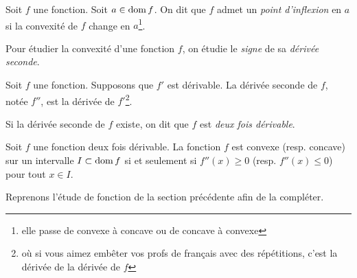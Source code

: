 \documentclass[main.tex]{subfiles}
\begin{document}
\begin{definition}
    
    Soit $f$ une fonction.
    Soit $a \in \operatorname{dom} f$.
    On dit que $f$ admet un \emph{point d'inflexion} en $a$ si la convexité de $f$ change en $a$\footnote{elle passe de convexe à concave ou de concave à convexe}.
\end{definition}

Pour étudier la convexité d'une fonction $f$, on étudie le \emph{signe} de sa \emph{dérivée seconde}.

\begin{definition}
    
    Soit $f$ une fonction.
    Supposons que $f'$ est dérivable.
    La dérivée seconde de $f$, notée $f''$, est la dérivée de $f'$\footnote{où si vous aimez embêter vos profs de français avec des répétitions, c'est la dérivée de la dérivée de $f$}.
\end{definition}

Si la dérivée seconde de $f$ existe, on dit que $f$ est \emph{deux fois dérivable}.

\begin{proposition}
    
    Soit $f$ une fonction deux fois dérivable.
    La fonction $f$ est convexe (resp. concave) sur un intervalle $I \subset \operatorname{dom} f$ si et seulement si $f''(x) \ge 0$ (resp. $f''(x) \le 0$)  pour tout $x \in I$.
\end{proposition}

Reprenons l'étude de fonction de la section précédente afin de la compléter.
\end{document}
